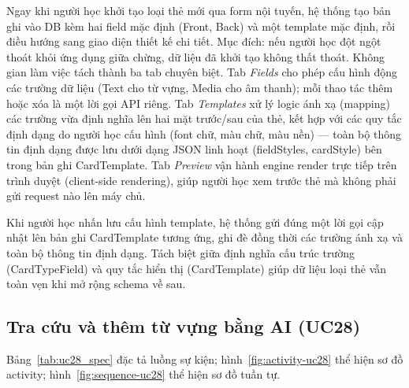 Ngay khi người học khởi tạo loại thẻ mới qua form nội tuyến, hệ thống tạo bản ghi vào DB kèm hai field mặc định (Front, Back) và một template mặc định, rồi điều hướng sang giao diện thiết kế chi tiết. Mục đích: nếu người học đột ngột thoát khỏi ứng dụng giữa chừng, dữ liệu đã khởi tạo không thất thoát. Không gian làm việc tách thành ba tab chuyên biệt. Tab \textit{Fields} cho phép cấu hình động các trường dữ liệu (Text cho từ vựng, Media cho âm thanh); mỗi thao tác thêm hoặc xóa là một lời gọi API riêng. Tab \textit{Templates} xử lý logic ánh xạ (mapping) các trường vừa định nghĩa lên hai mặt trước/sau của thẻ, kết hợp với các quy tắc định dạng do người học cấu hình (font chữ, màu chữ, màu nền) --- toàn bộ thông tin định dạng được lưu dưới dạng JSON linh hoạt (fieldStyles, cardStyle) bên trong bản ghi CardTemplate. Tab \textit{Preview} vận hành engine render trực tiếp trên trình duyệt (client-side rendering), giúp người học xem trước thẻ mà không phải gửi request nào lên máy chủ.

Khi người học nhấn lưu cấu hình template, hệ thống gửi đúng một lời gọi cập nhật lên bản ghi CardTemplate tương ứng, ghi đè đồng thời các trường ánh xạ và toàn bộ thông tin định dạng. Tách biệt giữa định nghĩa cấu trúc trường (CardTypeField) và quy tắc hiển thị (CardTemplate) giúp dữ liệu loại thẻ vẫn toàn vẹn khi mở rộng schema về sau.

\subsection{Tra cứu và thêm từ vựng bằng AI (UC28)}
Bảng~\ref{tab:uc28_spec} đặc tả luồng sự kiện; hình~\ref{fig:activity-uc28} thể hiện sơ đồ activity; hình~\ref{fig:sequence-uc28} thể hiện sơ đồ tuần tự.

